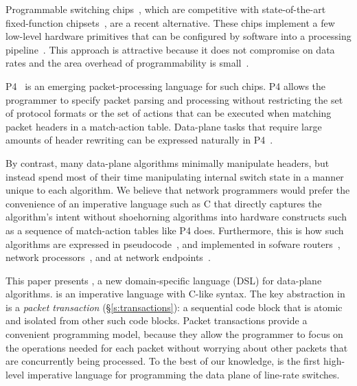 Programmable switching chips~\cite{flexpipe, xpliant, rmt}, which are
competitive with state-of-the-art fixed-function chipsets~\cite{trident,
tomahawk, mellanox}, are a recent alternative.  These chips implement a few
low-level hardware primitives that can be configured by software into a
processing pipeline~\cite{xpliant_sdk,xpliant_sdk2,intel_sdk}. This approach is
attractive because it does not compromise on data rates and the area overhead
of programmability is small~\cite{rmt}.

P4~\cite{p4, p4spec} is an emerging packet-processing language for such chips.
P4 allows the programmer to specify packet parsing and processing without
restricting the set of protocol formats or the set of actions that can be
executed when matching packet headers in a match-action table. Data-plane tasks
that require large amounts of header rewriting can be expressed naturally in
P4~\cite{dc_p4}.

By contrast, many data-plane algorithms minimally manipulate headers, but
instead spend most of their time manipulating internal switch state in a manner
unique to each algorithm. We believe that network programmers would prefer the
convenience of an imperative language such as C that directly captures the
algorithm's intent without shoehorning algorithms into hardware constructs such
as a sequence of match-action tables like P4 does.  Furthermore, this is how
such algorithms are expressed in pseudocode~\cite{red, csfq, codel_code, avq,
blue}, and implemented in sofware routers~\cite{click, dpdk, routebricks},
network processors~\cite{packetc, nova}, and at network endpoints~\cite{qdisc}.

This paper presents \pktlanguage, a new domain-specific language (DSL) for
data-plane algorithms.  \pktlanguage is an imperative language with C-like
syntax. The key abstraction in \pktlanguage is a {\em packet transaction}
(\S\ref{s:transactions}): a sequential code block that is atomic and isolated
from other such code blocks. Packet transactions provide a convenient
programming model, because they allow the programmer to focus on the operations
needed for each packet without worrying about other packets that are
concurrently being processed. To the best of our knowledge, \pktlanguage is the
first high-level imperative language for programming the data plane of
line-rate switches.


